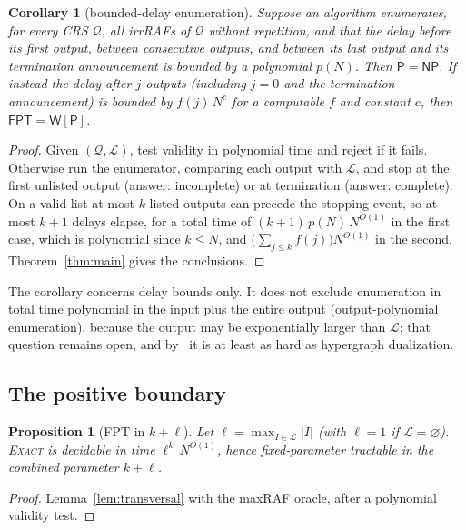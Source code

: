 \documentclass[11pt,a4paper]{article}
\theoremstyle{plain}
\newtheorem{proposition}[theorem]{Proposition}
\newtheorem{corollary}[theorem]{Corollary}
\theoremstyle{definition}
\theoremstyle{remark}
\newcommand{\Exact}{\textup{\textsc{Exact}}}
\newcommand{\NP}{\mathsf{NP}}
\newcommand{\Ptime}{\mathsf{P}}
\newcommand{\FPT}{\mathsf{FPT}}
\newcommand{\WP}{\mathsf{W[P]}}
\newcommand{\cL}{\mathcal{L}}
\newcommand{\cQ}{\mathcal{Q}}
\newcommand{\Nlen}{N}
\begin{document}
\begin{corollary}[bounded-delay enumeration]\label{cor:delay}
Suppose an algorithm enumerates, for every CRS $\cQ$, all irrRAFs of $\cQ$ without repetition, and that the delay before its first output, between consecutive outputs, and between its last output and its termination announcement is bounded by a polynomial $p(\Nlen)$. Then $\Ptime=\NP$. If instead the delay after $j$ outputs (including $j=0$ and the termination announcement) is bounded by $f(j)\,\Nlen^{c}$ for a computable $f$ and constant $c$, then $\FPT=\WP$.
\end{corollary}

\begin{proof}
Given $(\cQ,\cL)$, test validity in polynomial time and reject if it fails. Otherwise run the enumerator, comparing each output with $\cL$, and stop at the first unlisted output (answer: incomplete) or at termination (answer: complete). On a valid list at most $k$ listed outputs can precede the stopping event, so at most $k+1$ delays elapse, for a total time of $(k+1)\,p(\Nlen)\,\Nlen^{O(1)}$ in the first case, which is polynomial since $k\le\Nlen$, and $\bigl(\sum_{j\le k}f(j)\bigr)\Nlen^{O(1)}$ in the second. Theorem~\ref{thm:main} gives the conclusions.
\end{proof}

The corollary concerns delay bounds only. It does not exclude enumeration in total time polynomial in the input plus the entire output (output-polynomial enumeration), because the output may be exponentially larger than $\cL$; that question remains open, and by~\cite{minraf2026} it is at least as hard as hypergraph dualization.

\subsection{The positive boundary}

\begin{proposition}[FPT in $k+\ell$]\label{prop:fpt-boundary}
Let $\ell=\max_{I\in\cL}|I|$ (with $\ell=1$ if $\cL=\varnothing$). \Exact{} is decidable in time $\ell^{k}\,\Nlen^{O(1)}$, hence fixed-parameter tractable in the combined parameter $k+\ell$.
\end{proposition}

\begin{proof}
Lemma~\ref{lem:transversal} with the maxRAF oracle, after a polynomial validity test.
\end{proof}
\end{document}
